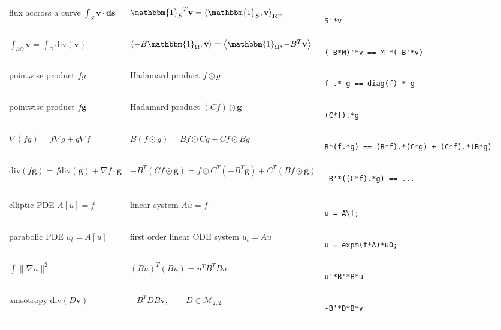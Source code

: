 \documentclass{article}
\def\R{\mathbf{R}}
\begin{document}
\begin{tabular}{l|l|b{}}
flux accross a curve $\int_{S}\mathbf{v}\cdot\mathbf{ds}$ &
${\mathbbm{1}_S}^T\mathbf{v} = \left\langle\mathbbm{1}_S,\mathbf{v}\right\rangle_{\R^m}$ &
\begin{verbatim}
S'*v
\end{verbatim}
\\
$\int_{\partial\Omega}\mathbf{v}=\int_\Omega\mathrm{div}(\mathbf{v})$ &
$\left\langle -B\mathbbm{1}_{\Omega},\mathbf{v}\right\rangle=\left\langle\mathbbm{1}_\Omega,-B^T\mathbf{v}\right\rangle$ &
\begin{verbatim}
(-B*M)'*v == M'*(-B'*v)
\end{verbatim}
\\
pointwise product $fg$ & Hadamard product $f\odot g$ &
\begin{verbatim}
f .* g == diag(f) * g
\end{verbatim}
\\
pointwise product $f\mathbf{g}$ & Hadamard product $(Cf)\odot\mathbf{g}$ &
\begin{verbatim}
(C*f).*g
\end{verbatim}
\\
$\nabla(fg)=f\nabla g+g\nabla f$ &
$B(f\odot g)= Bf\odot Cg+Cf\odot Bg$ &
\begin{verbatim}
B*(f.*g) == (B*f).*(C*g) + (C*f).*(B*g)
\end{verbatim}
\\
$\mathrm{div}(f\mathbf{g})=f\mathrm{div}(\mathbf{g})+\nabla f\cdot\mathbf{g}$ &
$-B^T(Cf\odot\mathbf{g})= f\odot C^T(-B^T\mathbf{g})+C^T\left(Bf\odot\mathbf{g}\right)$ &
\begin{verbatim}
-B'*((C*f).*g) == ...
\end{verbatim}
\\
&&\\
elliptic PDE $A[u]=f$ &
linear system $Au=f$ &
\begin{verbatim}
u = A\f;
\end{verbatim}
\\
parabolic PDE $u_t=A[u]$ &
first order linear ODE system $u_t=Au$ &
\begin{verbatim}
u = expm(t*A)*u0;
\end{verbatim}
\\
$\int\|\nabla u\|^2$ &
$(Bu)^T(Bu)=u^TB^TBu$ &
\begin{verbatim}
u'*B'*B*u
\end{verbatim}
\\
anisotropy $\mathrm{div}(D\mathbf{v})$ &
$-B^TDB\mathbf{v},\qquad D\in\mathcal{M}_{2,2}$ &
\begin{verbatim}
-B'*D*B*v
\end{verbatim}
\\
\end{tabular}
\end{document}
